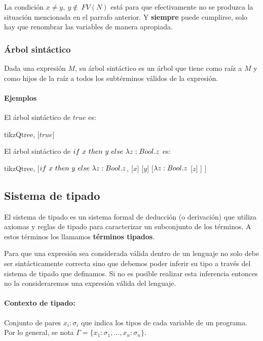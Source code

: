 La condición $x\neq y,~y\notin~FV(N)$ está para que efectivamente no se produzca la situación mencionada en el parrafo anterior. Y \textbf{siempre} puede cumplirse, solo hay que renombrar las variables de manera apropiada.

\subsubsection{Árbol sintáctico}
Dada una expresión $M$, su árbol sintáctico es un árbol que tiene como raíz a $M$ y como hijos de la raíz a todos los subtérminos válidos de la expresión.
\paragraph{Ejemplos}
El árbol sintáctico de $true$ es:
\begin{center}
	\begin{forest} tikzQtree,
		[$true$]
	\end{forest}
\end{center}

El árbol sintáctico de $if~ x~ then~ y~ else~ \lambda z: Bool . z$ es:

\begin{center}
	\begin{forest} tikzQtree,
		[$if~ x~ then~ y~ else~ \lambda z: Bool . z$, 
		[$x$]
		[$y$]
		[$\lambda z: Bool . z$
		[$z$]
		]
		]
	\end{forest}
\end{center}

\subsection{Sistema de tipado}
El sistema de tipado es un sistema formal de deducción (o derivación) que utiliza axiomas y reglas de tipado para caracterizar un subconjunto de los términos. A estos términos los llamamos \textbf{términos tipados}.

Para que una expresión sea considerada válida dentro de un lenguaje no solo debe ser sintácticamente correcta sino que debemos poder inferir su tipo a través del sistema de tipado que definamos. Si no es posible realizar esta inferencia entonces no la consideraremos una expresión válida del lenguaje.

\paragraph{Contexto de tipado:} Conjunto de pares $x_i:\sigma_i$ que indica los tipos de cada variable de un programa. Por lo general, se nota  $\Gamma = \{x_1:\sigma_1, \dots, x_n:\sigma_n\}$.

